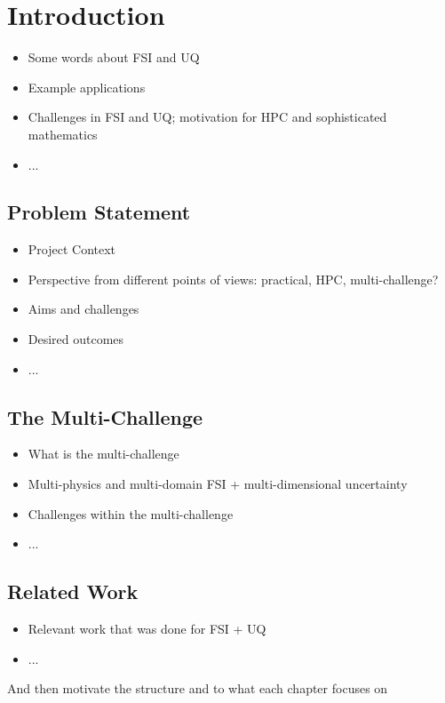 \chapter{Introduction}
\label{chapter:Introduction}
\begin{itemize}
\item Some words about FSI and UQ
\item Example applications
\item Challenges in FSI and UQ; motivation for HPC and sophisticated mathematics
\item ...
\end{itemize}	
\section{Problem Statement}
\label{sec:Problem Statement}
\begin{itemize}
\item Project Context
\item Perspective from different points of views: practical, HPC, multi-challenge?
\item Aims and challenges
\item Desired outcomes
\item ...
\end{itemize}	
\section{The Multi-Challenge}
\label{sec:The Multi-Challenge}
\begin{itemize}
\item What is the multi-challenge
\item Multi-physics and multi-domain FSI + multi-dimensional uncertainty
\item Challenges within the multi-challenge
\item ...
\end{itemize}	
\section{Related Work}
\label{sec:Related Work}
\begin{itemize}
\item Relevant work that was done for FSI + UQ
\item ...
\end{itemize}
And then motivate the structure and to what each chapter focuses on


